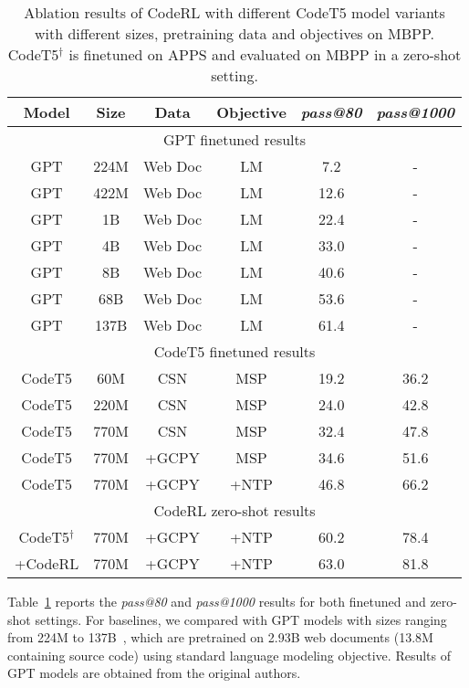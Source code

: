 \documentclass{article}
\begin{document}
\begin{table}[t]
\end{table} \begin{table}[t]
\centering
\caption{Ablation results of CodeRL with different CodeT5 model variants with different sizes, pretraining data and objectives on MBPP. CodeT5$^{\dag}$ is finetuned on APPS and evaluated on MBPP in a zero-shot setting.}\label{tab:mbpp}
\begin{tabular}{cc|cc|cc}
\hline
Model & Size & Data & Objective & \emph{pass@80} & \emph{pass@1000} \\    
\hline
\multicolumn{6}{c}{\cellcolor[HTML]{EFEFEF} GPT finetuned results} \\
\hline
GPT & 224M & Web Doc   & LM     & 7.2 &- \\ 
GPT & 422M & Web Doc   & LM     & 12.6 &-\\ 
GPT & 1B & Web Doc   & LM   & 22.4 &-\\       
GPT & 4B & Web Doc   & LM     & 33.0 &-\\   
GPT & 8B & Web Doc   & LM     & 40.6 &-\\   
GPT & 68B & Web Doc   & LM    & 53.6 &-\\   
GPT & 137B & Web Doc   & LM      & 61.4 &-\\   
\hline
\multicolumn{6}{c}{\cellcolor[HTML]{EFEFEF} CodeT5 finetuned results} \\
\hline
  
CodeT5 & 60M     & CSN       & MSP          & 19.2 & 36.2\\
CodeT5 &220M      & CSN     & MSP         & 24.0 &42.8\\
CodeT5 &770M        & CSN       & MSP         & 32.4& 47.8\\
CodeT5 &770M   & +GCPY    & MSP         & 34.6        &51.6\\
CodeT5 &770M       & +GCPY     & +NTP      & 46.8 &66.2\\
\hline
\multicolumn{6}{c}{\cellcolor[HTML]{EFEFEF} CodeRL zero-shot results} \\
\hline
CodeT5$^{\dag}$ &770M       & +GCPY      & +NTP       & 60.2&78.4\\
+CodeRL &770M       & +GCPY      & +NTP       & 63.0 &81.8\\
\hline
\end{tabular}
\end{table} 
Table~\ref{tab:mbpp} reports the  \emph{pass@80} and  \emph{pass@1000} results for both finetuned and zero-shot settings.  For baselines, we compared with GPT models with sizes ranging from 224M to 137B~\citep{austin2021program}, which are pretrained on 2.93B web documents (13.8M containing source code) using standard language modeling objective.  Results of GPT models are obtained from the original authors.
\end{document}
